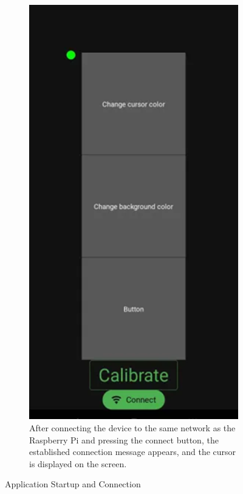\documentclass[12pt,a4paper]{article}
\begin{document}
\begin{figure}[htbp]
\begin{subfigure}{0.45\textwidth}
    \end{subfigure}
    \hfill
    \begin{subfigure}{0.45\textwidth}
        \centering
        \includegraphics[scale=0.4]{../IoT Materials/article images/9-Screen-showcase-with-pointer-after-connection.png}
        \caption{After connecting the device to the same network as the Raspberry Pi and pressing the connect button, the established connection message appears, and the cursor is displayed on the screen.}
    \end{subfigure}
    \caption{Application Startup and Connection}
\end{figure}
\end{document}
